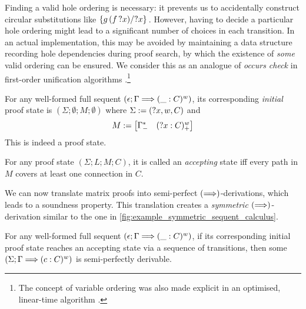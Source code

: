 \documentclass[twoside]{report}
\begin{document}
Finding a valid hole ordering is necessary: it prevents us to accidentally construct circular substitutions like $\subst {?x} {\app g {(\app f {?x})}} {}$. However, having to decide a particular hole ordering might lead to a significant number of choices in each transition. In an actual implementation, this may be avoided by maintaining a data structure recording hole dependencies during proof search, by which the existence of \emph{some} valid ordering can be ensured. We consider this as an analogue of \emph{occurs check} in first-order unification algorithms \cite{robinson1965machine}.\footnote{The concept of variable ordering was also made explicit in an optimised, linear-time algorithm \cite{martelli1982efficient}.}

\begin{definition}
\label{def:matrix_initial_states}
For any well-formed full sequent $(\epsilon; \Gamma \vdashs (\_ : C)^w)$, its corresponding \emph{initial} proof state is $(\Sigma; \emptyset; M; \emptyset)$ where $\Sigma \defeq ({?x}, w, C)$ and
$$
M \defeq \mat{\Gamma^\ast_- & ({?x} : C)^w_+}
$$
This is indeed a proof state.
\end{definition}

\begin{definition}
\label{def:matrix_accepting_states}
For any proof state $(\Sigma; L; M; C)$, it is called an \emph{accepting} state iff every path in $M$ covers at least one connection in $C$.
\end{definition}

We can now translate matrix proofs into semi-perfect $(\vdashs)$-derivations, which leads to a soundness property. This translation creates a \emph{symmetric} $(\vdashs)$-derivation similar to the one in \cref{fig:example_symmetric_sequent_calculus}.

\begin{proposition}[Correspondence]
\label{thm:matrix_to_defocused_calculus}
For any well-formed full sequent $(\epsilon; \Gamma \vdashs (\_ : C)^w)$, if its corresponding initial proof state reaches an accepting state via a sequence of transitions, then some $(\Sigma; \Gamma \vdashs (c : C)^w)$ is semi-perfectly derivable.
\end{proposition}
\end{document}
